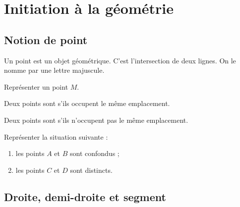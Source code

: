 \documentclass[a4paper,10pt]{report}
\begin{document}
\setcounter{chapter}{1}
\chapter{Initiation à la géométrie}

\section{Notion de point}

\begin{defn}
Un point est un objet géométrique. C'est l'intersection de deux lignes. On le nomme par une lettre majuscule.
\end{defn}

\begin{ex}
Représenter un point $M$.

\noindent\grandscarreaux{\linewidth}{1.8cm}
\end{ex}

\begin{defn}
Deux points sont \dotfill s'ils occupent le même emplacement. 

\medskip \noindent Deux points sont \dotfill s'ils n'occupent pas le même emplacement.
\end{defn}

\begin{ex}
Représenter la situation suivante :
\begin{enumerate}
\item[•] les points $A$ et $B$ sont confondus ;
\item[•] les points $C$ et $D$ sont distincts.
\end{enumerate}

\medskip\noindent\grandscarreaux{\linewidth}{2cm}
\end{ex}

\section{Droite, demi-droite et segment}
\end{document}

